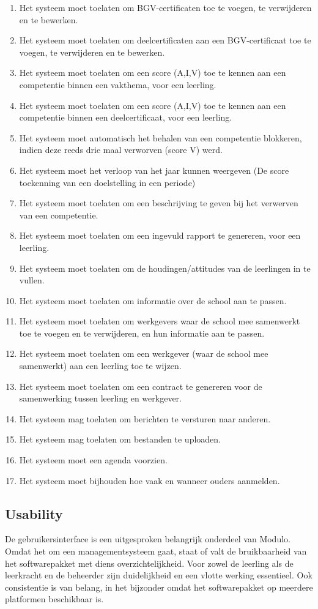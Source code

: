 \documentclass[a4paper]{article}
\begin{document}
\begin{enumerate}
\item Het systeem moet toelaten om BGV-certificaten toe te voegen, te verwijderen en te bewerken.
\item Het systeem moet toelaten om deelcertificaten aan een BGV-certificaat toe te voegen, te verwijderen en te bewerken.
\item Het systeem moet toelaten om een score (A,I,V) toe te kennen aan een competentie binnen een vakthema, voor een leerling.  %
\item Het systeem moet toelaten om een score (A,I,V) toe te kennen aan een competentie binnen een deelcertificaat, voor een leerling.  %
\item Het systeem moet automatisch het behalen van een competentie blokkeren, indien deze reeds drie maal verworven (score V) werd.  %
\item Het systeem moet het verloop van het jaar kunnen weergeven (De score toekenning van een doelstelling in een periode)
\item Het systeem moet toelaten om een beschrijving te geven bij het verwerven van een competentie.
\item Het systeem moet toelaten om een ingevuld rapport te genereren, voor een leerling.
\item Het systeem moet toelaten om de houdingen/attitudes van de leerlingen in te vullen.
\item Het systeem moet toelaten om informatie over de school aan te passen.
\item Het systeem moet toelaten om werkgevers waar de school mee samenwerkt toe te voegen en te verwijderen, en hun informatie aan te passen.
\item Het systeem moet toelaten om een werkgever (waar de school mee samenwerkt) aan een leerling toe te wijzen.
\item Het systeem moet toelaten om een contract te genereren voor de samenwerking tussen leerling en werkgever.
\item Het systeem mag toelaten om berichten te versturen naar anderen.  
\item Het systeem mag toelaten om bestanden te uploaden. 
\item Het systeem moet een agenda voorzien.
\item Het systeem moet bijhouden hoe vaak en wanneer ouders aanmelden.
\end{enumerate}

\subsection{Usability}
De gebruikersinterface is een uitgesproken belangrijk onderdeel van Modulo. Omdat het om een managementsysteem gaat, staat of valt de bruikbaarheid van het softwarepakket met diens overzichtelijkheid. Voor zowel de leerling als de leerkracht en de beheerder zijn duidelijkheid en een vlotte werking essentieel. Ook consistentie is van belang, in het bijzonder omdat het softwarepakket op meerdere platformen beschikbaar is.
\end{document}
